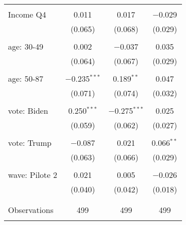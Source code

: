 \begin{tabular}{@{\extracolsep{5pt}}lccc}
  & & & \\ 
 Income Q4 & 0.011 & 0.017 & $-$0.029 \\ 
  & (0.065) & (0.068) & (0.029) \\ 
  & & & \\ 
 age: 30-49 & 0.002 & $-$0.037 & 0.035 \\ 
  & (0.064) & (0.067) & (0.029) \\ 
  & & & \\ 
 age: 50-87 & $-$0.235$^{***}$ & 0.189$^{**}$ & 0.047 \\ 
  & (0.071) & (0.074) & (0.032) \\ 
  & & & \\ 
 vote: Biden & 0.250$^{***}$ & $-$0.275$^{***}$ & 0.025 \\ 
  & (0.059) & (0.062) & (0.027) \\ 
  & & & \\ 
 vote: Trump & $-$0.087 & 0.021 & 0.066$^{**}$ \\ 
  & (0.063) & (0.066) & (0.029) \\ 
  & & & \\ 
 wave: Pilote 2 & 0.021 & 0.005 & $-$0.026 \\ 
  & (0.040) & (0.042) & (0.018) \\ 
  & & & \\ 
\hline \\[-1.8ex] 

Observations & 499 & 499 & 499 \\ 
\hline 
\hline \\[-1.8ex] 
\end{tabular} 